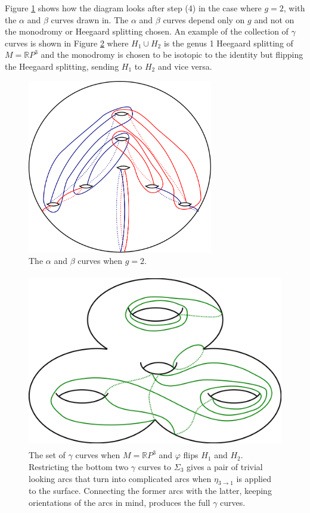 \documentclass[12pt]{amsart}
\newcommand{\R}{\mathbb{R}}
\theoremstyle{definition}
\theoremstyle{remark}
\begin{document}
Figure \ref{firsttwocolors} shows how the diagram looks after step (4) in the case where $g=2$, with the $\alpha$ and $\beta$ curves drawn in.
The $\alpha$ and $\beta$ curves depend only on $g$ and not on the monodromy or Heegaard splitting chosen.
An example of the collection of $\gamma$ curves is shown in Figure \ref{greenex} where $H_1 \cup H_2$ is the genus 1 Heegaard splitting of $M = \R P^3$ and the monodromy is chosen to be isotopic to the identity but flipping the Heegaard splitting, sending $H_1$ to $H_2$ and vice versa.

\begin{figure}[h]
\centering
\includegraphics[height=3in]{diagrampart1.png}
\caption{The $\alpha$ and $\beta$ curves when $g=2$.}
\label{firsttwocolors}
\end{figure}

\begin{figure}[h]
\centering
\includegraphics[height=3in]{s1rp3_green.png}
\caption{The set of $\gamma$ curves when $M =\R P^3$ and $\varphi$ flips $H_1$ and $H_2$.
Restricting the bottom two $\gamma$ curves to $\Sigma_3$ gives a pair of trivial looking arcs that turn into complicated arcs when $\eta_{3 \to 1}$ is applied to the surface.
Connecting the former arcs with the latter, keeping orientations of the arcs in mind, produces the full $\gamma$ curves.}
\label{greenex}
\end{figure}
\end{document}
